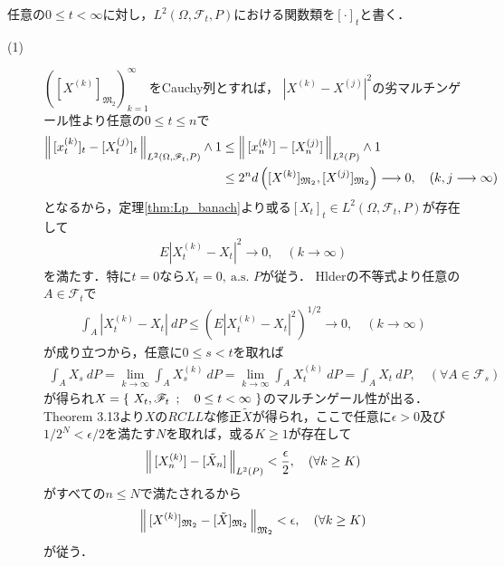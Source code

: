 	\begin{prf} 任意の$0 \leq t < \infty$に対し，$L^2(\Omega,\mathscr{F}_t,P)$における関数類を$[\cdot]_t$と書く．
		\begin{description}
			\item[(1)] $\left([X^{(k)}]_{\mathfrak{M}_2}\right)_{k=1}^\infty$をCauchy列とすれば，
				$|X^{(k)} - X^{(j)}|^2$の劣マルチンゲール性より任意の$0 \leq t \leq n$で
				\begin{align}
					\left\|\, [x^{(k)}_t]_t - [X^{(j)}_t]_t\, \right\|_{L^2(\Omega,\mathscr{F}_t,P)} \wedge 1
					&\leq \left\|\, [x^{(k)}_n] - [X^{(j)}_n]\, \right\|_{L^2(P)} \wedge 1 \\
					&\leq 2^n d\left( [X^{(k)}]_{\mathfrak{M}_2}, [X^{(j)}]_{\mathfrak{M}_2}\right)
					\longrightarrow 0,
					\quad (k,j \longrightarrow \infty)
				\end{align}
				となるから，定理\ref{thm:Lp_banach}より或る$[X_t]_t \in L^2(\Omega,\mathscr{F}_t,P)$が存在して
				\begin{align}
					E \left|X^{(k)}_t - X_t\right|^2 \longrightarrow 0,
					\quad (k \longrightarrow \infty)
				\end{align}
				を満たす．特に$t = 0$なら$X_t = 0,\ \mbox{a.s. $P$}$が従う．
				Hlderの不等式より任意の$A \in \mathscr{F}_t$で
				\begin{align}
					\int_A \left|X^{(k)}_t - X_t\right|\ dP
					\leq \left( E \left|X^{(k)}_t - X_t\right|^2 \right)^{1/2}
					\longrightarrow 0,
					\quad (k \longrightarrow \infty)
				\end{align}
				が成り立つから，任意に$0 \leq s < t$を取れば
				\begin{align}
					\int_A X_s\ dP
					= \lim_{k \to \infty} \int_A X^{(k)}_s\ dP
					= \lim_{k \to \infty} \int_A X^{(k)}_t\ dP
					= \int_A X_t\ dP,
					\quad (\forall A \in \mathscr{F}_s)
				\end{align}
				が得られ$X = \left\{\ X_t,\mathscr{F}_t\ \, ; \quad 0 \leq t < \infty\ \right\}$のマルチンゲール性が出る．
				Theorem 3.13より$X$の$RCLL$な修正$\tilde{X}$が得られ，ここで任意に$\epsilon > 0$及び
				$1/2^N < \epsilon/2$を満たす$N$を取れば，或る$K \geq 1$が存在して
				\begin{align}
					\left\|\, [X^{(k)}_n] - [\tilde{X}_n]\, \right\|_{L^2(P)} < \frac{\epsilon}{2},
					\quad (\forall k \geq K)
				\end{align}
				がすべての$n \leq N$で満たされるから
				\begin{align}
					\left\|\, [X^{(k)}]_{\mathfrak{M}_2} - [\tilde{X}]_{\mathfrak{M}_2}\, \right\|_{\mathfrak{M}_2} < \epsilon,
					\quad (\forall k \geq K)
				\end{align}
				が従う．
		\end{description}
	\end{prf}